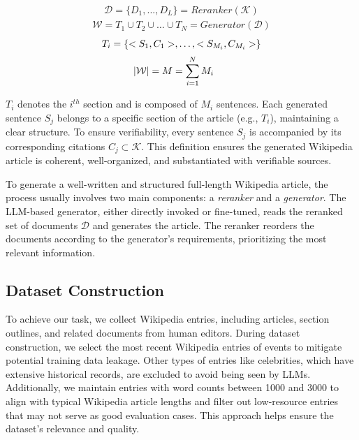 \documentclass[11pt]{article}
\begin{document}
\begin{normalsize}
\small{
\begin{align}
    \mathcal{D} = \{D_1, ..., D_L\} = \textit{Reranker}(\mathcal{K})
\end{align}
\begin{align}
    \mathcal{W} = T_1 \cup T_2 \cup \ldots \cup T_N = \textit{Generator}(\mathcal{D})
\end{align}
\begin{align}
    T_i &= \{<S_1, C_1>, \ldots, <S_{M_i}, C_{M_i}>\} \notag \\[2pt] 
    &\text{ } \qquad |\mathcal{W}| = M = \sum_{i=1}^{N} M_i 
\end{align}
}
\end{normalsize}

$T_i$  denotes the $i^{th}$ section and is composed of $M_i$ sentences. Each generated sentence $S_j$ belongs to a specific section of the article (e.g., $T_i$), maintaining a clear structure. To ensure verifiability, every sentence $S_j$ is accompanied by its corresponding citations $C_j \subset \mathcal{K}$. This definition ensures the generated Wikipedia article is coherent, well-organized, and substantiated with verifiable sources.

To generate a well-written and structured full-length Wikipedia article, the process usually involves two main components: a \textit{reranker} and a \textit{generator}. The LLM-based generator, either directly invoked or fine-tuned, reads the reranked set of documents $\mathcal{D}$ and generates the article. The reranker reorders the documents according to the generator's requirements, prioritizing the most relevant information.

\subsection{Dataset Construction}
To achieve our task, we collect Wikipedia entries, including articles, section outlines, and related documents from human editors. During dataset construction, we select the most recent Wikipedia entries of events to mitigate potential training data leakage. Other types of entries like celebrities, which have extensive historical records, are excluded to avoid being seen by LLMs. Additionally, we maintain entries with word counts between 1000 and 3000 to align with typical Wikipedia article lengths and filter out low-resource entries that may not serve as good evaluation cases. This approach helps ensure the dataset's relevance and quality.
\end{document}
